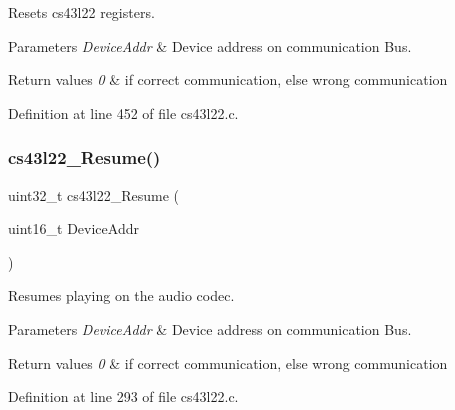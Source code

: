 Resets cs43l22 registers. 


\begin{DoxyParams}{Parameters}
{\em Device\+Addr} & Device address on communication Bus. \\
\hline
\end{DoxyParams}

\begin{DoxyRetVals}{Return values}
{\em 0} & if correct communication, else wrong communication \\
\hline
\end{DoxyRetVals}


Definition at line 452 of file cs43l22.\+c.

\mbox{\label{group___c_s43_l22___private___functions_ga579c0ef6455060e9117632f8d83d606a}} 
\subsubsection{\texorpdfstring{cs43l22\+\_\+\+Resume()}{cs43l22\_Resume()}}
{\footnotesize\ttfamily uint32\+\_\+t cs43l22\+\_\+\+Resume (\begin{DoxyParamCaption}\item[{uint16\+\_\+t}]{Device\+Addr }\end{DoxyParamCaption})}



Resumes playing on the audio codec. 


\begin{DoxyParams}{Parameters}
{\em Device\+Addr} & Device address on communication Bus. \\
\hline
\end{DoxyParams}

\begin{DoxyRetVals}{Return values}
{\em 0} & if correct communication, else wrong communication \\
\hline
\end{DoxyRetVals}


Definition at line 293 of file cs43l22.\+c.

\mbox{\label{group___c_s43_l22___private___functions_ga1ea4920e35f5e5f903870a50b53bc719}} 
